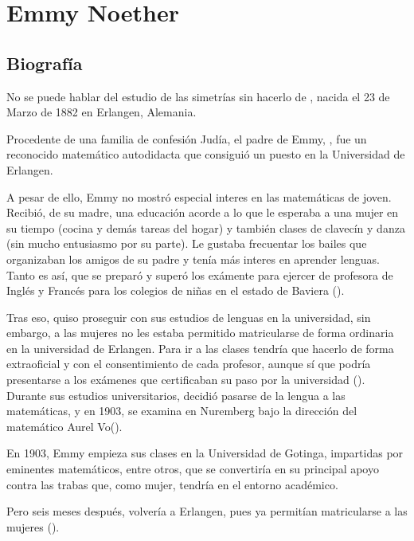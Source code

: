 \chapter{Emmy Noether}\label{ch:emmy-noether}

\section{Biografía}\label{sec:biografia}

No se puede hablar del estudio de las simetrías sin hacerlo de , nacida el 23 de Marzo de 1882 en Erlangen, Alemania.

Procedente de una familia de confesión Judía, el padre de Emmy, , fue un reconocido matemático autodidacta que consiguió un puesto en la Universidad de Erlangen.

A pesar de ello, Emmy no mostró especial interes en las matemáticas de joven.
Recibió, de su madre, una educación acorde a lo que le esperaba a una mujer en su tiempo (cocina y demás tareas del hogar) y también clases de clavecín y danza (sin mucho entusiasmo por su parte).
Le gustaba frecuentar los bailes que organizaban los amigos de su padre y tenía más interes en aprender lenguas.
Tanto es así, que se preparó y superó los exámente para ejercer de profesora de Inglés y Francés para los colegios de niñas en el estado de Baviera (\cite{Carrasco}).

Tras eso, quiso proseguir con sus estudios de lenguas en la universidad, sin embargo, a las mujeres no les estaba permitido matricularse de forma ordinaria en la universidad de Erlangen.
Para ir a las clases tendría que hacerlo de forma extraoficial y con el consentimiento de cada profesor, aunque sí que podría presentarse a los exámenes que certificaban su paso por la universidad (\cite{Kimberling}).
Durante sus estudios universitarios, decidió pasarse de la lengua a las matemáticas, y en 1903, se examina en Nuremberg bajo la dirección del matemático Aurel Vo\beta (\cite{Kimberling}).

En 1903, Emmy empieza sus clases en la Universidad de Gotinga, impartidas por eminentes matemáticos, entre otros,  que se convertiría en su principal apoyo contra las trabas que, como mujer, tendría en el entorno académico.

Pero seis meses después, volvería a Erlangen, pues ya permitían matricularse a las mujeres (\cite{Kimberling}).


